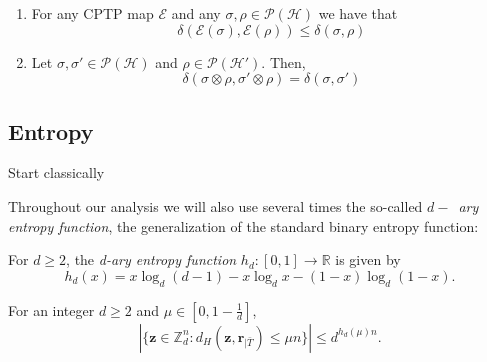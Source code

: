 
\begin{lemma}

\begin{enumerate}

    The trace distance has the following properties:

    \item For any CPTP map $\mathcal{E}$ and any $\sigma, \rho \in \mathcal{P}(\mathcal{H})$ we have that
    $$\delta(\mathcal{E}(\sigma), \mathcal{E}(\rho)) \leq \delta(\sigma, \rho)$$
    
    \item Let $\sigma, \sigma' \in \mathcal{P}(\mathcal{H})$ and $\rho \in \mathcal{P}(\mathcal{H}')$. Then,
    $$\delta(\sigma\otimes \rho, \sigma'\otimes \rho) = \delta(\sigma, \sigma')$$
\end{enumerate}

\label{lemma:trace_distance}
\end{lemma}


\subsection{Entropy}

{\cv Start classically}

Throughout our analysis we will also use several times the so-called $d-$~\textit{ary entropy function}, the generalization of the standard binary entropy function:
\begin{definition}

For $d\geq 2$, the \textit{d-ary entropy function} $h_d : [0,1]\rightarrow\mathbb{R}$ is given by
\begin{equation*}
    h_d(x) = x \log_d(d-1) - x \log_d x - (1-x) \log_d (1-x).
\end{equation*}
\label{def:q-ary}

\end{definition}

\begin{lemma}
\label{lemma:hammingBall}
For an integer $d\geq 2$ and $\mu \in [0, 1-\frac{1}{d}]$,
\begin{equation*}
    |\{ \boldsymbol{z}\in \mathbb{Z}_d^{n}: d_H(\boldsymbol{z}, \boldsymbol{r}_{|\bar{T}})\leq \mu n \}| \leq d^{h_d(\mu)n}.
\end{equation*}
\end{lemma} 



